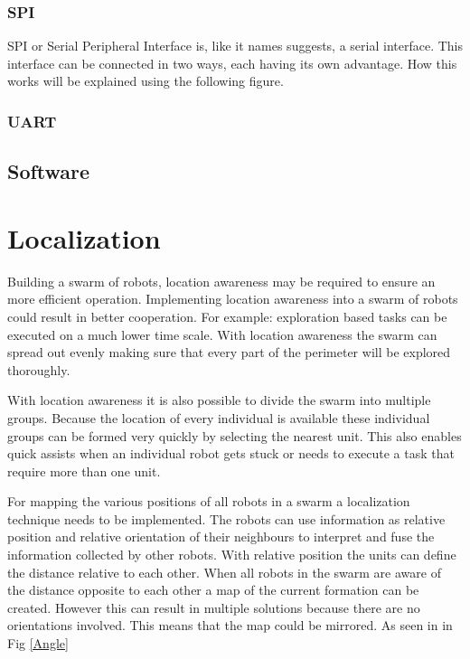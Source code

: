 \documentclass[10pt,a4paper]{article}
\begin{document}
\subsubsection{SPI}
SPI or Serial Peripheral Interface is, like it names suggests, a serial interface. This interface can be connected in two ways, each having its own advantage. How this works will be explained using the following figure.

\subsubsection{UART}
\subsection{Software}


\newpage
\section{Localization}
Building a swarm of robots, location awareness may be required to ensure an more efficient operation. Implementing location awareness into a swarm of robots could result in better cooperation. For example: exploration based tasks can be executed on a much lower time scale. With location awareness the swarm can spread out evenly making sure that every part of the perimeter will be explored thoroughly. 

With location awareness it is also possible to divide the swarm into multiple groups. Because the location of every individual is available these individual groups can be formed very quickly by selecting the nearest unit. This also enables quick assists when an individual robot gets stuck or needs to execute a task that require more than one unit.

For mapping the various positions of all robots in a swarm a localization technique needs to be implemented. The robots can use information as relative position and relative orientation of their neighbours to interpret and fuse the information collected by other robots. With relative position the units can define the distance relative to each other. When all robots in the swarm are aware of the distance opposite to each other a map of the current formation can be created. However this can result in multiple solutions because there are no orientations involved. This means that the map could be mirrored. As seen in in Fig \ref{Angle}
\end{document}
